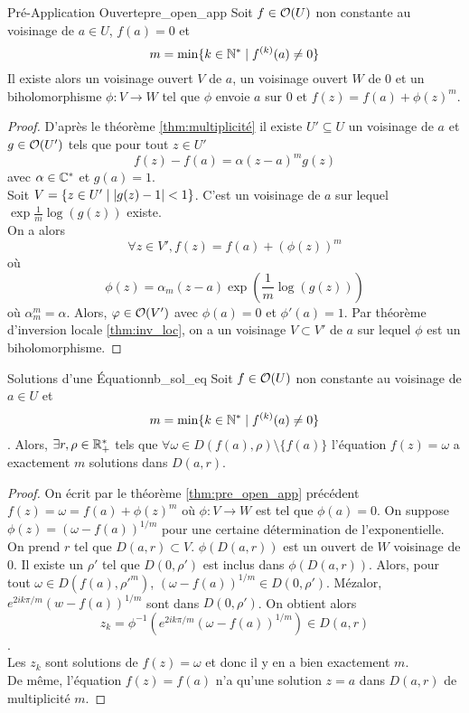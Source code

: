 \documentclass{cours}
\begin{document}
\begin{théorème}{Pré-Application Ouverte}{pre_open_app}
    Soit $f \in \mathcal{O}(U)$ non constante au voisinage de $a \in U$, $f(a) = 0$ et \[m = \min\{k \in \mathbb{N}^{*}\mid f^{(k)}(a) \neq 0\}\]
    Il existe alors un voisinage ouvert $V$ de $a$, un voisinage ouvert $W$ de $0$ et un biholomorphisme $\phi : V\to W$ tel que $\phi$ envoie $a$ sur $0$ et $f(z) = f(a) + \phi(z)^{m}$.
\end{théorème}
\begin{proof}
    D'après le théorème \ref{thm:multiplicité} il existe $U'\subseteq U$ un voisinage de $a$ et $g\in \mathcal{O}(U')$ tels que pour tout $z \in U'$
    \[
        f(z) - f(a) = \alpha(z - a)^{m}g(z)
    \]
    avec $\alpha \in \mathbb{C}^{*}$ et $g(a) = 1$.\\
    Soit $ V = \left\{z \in U'\mid \left|g(z) - 1\right| < 1\right\}$. C'est un voisinage de $a$ sur lequel $\exp \frac{1}{m}\log(g(z))$ existe.\\
    On a alors
    \[
        \forall z \in V', f(z) = f(a) + \left(\phi(z)\right)^{m}
    \]
    où 
    \[
        \phi(z) = \alpha_{m}(z - a)\exp\left(\frac{1}{m}\log(g(z))\right)
    \]
    où $\alpha_{m}^{m} = \alpha$. Alors, $\varphi \in \mathcal{O}(V')$ avec $\phi(a) = 0$ et $\phi'(a) = 1$. Par théorème d'inversion locale \ref{thm:inv_loc}, on a un voisinage $V \subset V'$ de $a$ sur lequel $\phi$ est un biholomorphisme.
\end{proof}

\begin{corollaire}{Solutions d'une Équation}{nb_sol_eq}
    Soit $f\in \mathcal{O}(U)$ non constante au voisinage de $a \in U$ et \[m = \min\{k \in \mathbb{N}^{*}\mid f^{(k)}(a) \neq 0\}\]. Alors, $\exists r,\rho \in \mathbb{R}_{+}^{*}$ tels que $\forall \omega \in D(f(a), \rho) \setminus \{f(a)\}$ l'équation $f(z) = \omega$ a exactement $m$ solutions dans $D(a, r)$.
\end{corollaire}
\begin{proof}
    On écrit par le théorème \ref{thm:pre_open_app} précédent $f(z) = \omega = f(a) + \phi(z)^{m}$ où $\phi : V \to W$ est tel que $\phi(a) = 0$. On suppose $\phi(z) = \left(\omega - f(a)\right)^{1/m}$ pour une certaine détermination de l'exponentielle. 
    On prend $r$ tel que $D(a, r) \subset V$. $\phi(D(a, r))$ est un ouvert de $W$ voisinage de $0$. Il existe un $\rho'$ tel que $D(0, \rho')$ est inclus dans $\phi(D(a, r))$. 
    Alors, pour tout $\omega \in D(f(a), \rho'^{m})$, $\left(\omega - f(a)\right)^{1/m} \in D(0, \rho')$. Mézalor, $e^{2ik\pi/m}\left(w -f(a)\right)^{1/m}$ sont dans $D(0, \rho')$.
    On obtient alors \[z_{k} = \phi^{-1}\left(e^{2ik\pi/m}\left(\omega - f(a)\right)^{1/m}\right) \in D(a, r)\].\\
    Les $z_{k}$ sont solutions de $f(z) = \omega$ et donc il y en a bien exactement $m$. \\
    De même, l'équation $f(z) = f(a)$ n'a qu'une solution $z = a$ dans $D(a, r)$ de multiplicité $m$.
\end{proof}
\end{document}
